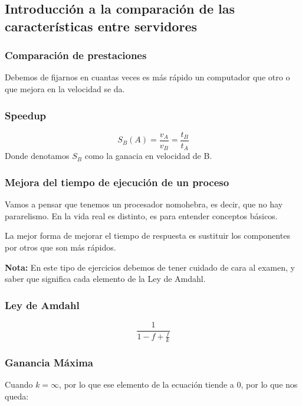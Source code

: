 \subsection{Introducción a la comparación de las características entre servidores}

\subsubsection{Comparación de prestaciones}

Debemos de fijarnos en cuantas veces es más rápido un computador que otro o que mejora en la velocidad se da.

\subsubsection{Speedup}

\begin{equation}
    S_B(A) = \frac{v_A}{v_B} = \frac{t_B}{t_A}
\end{equation}
Donde denotamos $S_B$ como la ganacia en velocidad de B.

\subsubsection{Mejora del tiempo de ejecución de un proceso}

Vamos a pensar que tenemos un procesador nomohebra, es decir, que no hay pararelismo. En la vida real es distinto, es para entender conceptos básicos.

La mejor forma de mejorar el tiempo de respuesta es sustituir los componentes por otros que son más rápidos.

\textbf{Nota:} En este tipo de ejercicios debemos de tener cuidado de cara al examen, y saber que significa cada elemento de la Ley de Amdahl.

\subsubsection{Ley de Amdahl}

\begin{equation}
    \frac{1}{1-f + \frac{f}{k}}
\end{equation}

\subsubsection{Ganancia Máxima}

Cuando $k=\infty$, por lo que ese elemento de la ecuación tiende a 0, por lo que nos queda:

